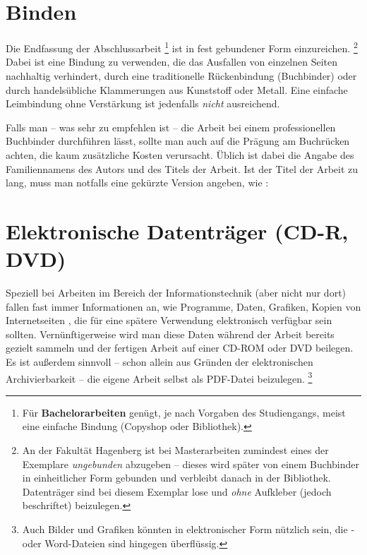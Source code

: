 \section{Binden}

Die Endfassung der Abschlussarbeit%
\footnote{Für \textbf{Bachelorarbeiten} genügt, je nach Vorgaben des Studiengangs, meist eine einfache Bindung (Copyshop oder Bibliothek).}
ist in fest gebundener Form
einzureichen.%
\footnote{An der Fakultät Hagenberg ist bei Masterarbeiten zumindest eines der
Exemplare \emph{ungebunden} abzugeben -- dieses wird später von einem
Buchbinder in einheitlicher Form gebunden und verbleibt
danach in der Bibliothek. Datenträger sind bei diesem Exemplar lose 
und \emph{ohne} Aufkleber (jedoch beschriftet) beizulegen.}
Dabei ist eine Bindung zu
verwenden, die das Ausfallen von einzelnen Seiten nachhaltig
verhindert, \zB durch eine traditionelle Rückenbindung
(Buchbinder) oder durch handelsübliche Klammerungen aus Kunststoff
oder Metall. Eine einfache Leimbindung ohne Verstärkung ist
jedenfalls \emph{nicht} ausreichend.


Falls man -- was sehr zu empfehlen ist -- die Arbeit bei einem
professionellen Buchbinder durchführen lässt, sollte man auch auf
die Prägung am Buchrücken achten, die kaum zusätzliche Kosten
verursacht. Üblich ist dabei die Angabe des Familiennamens des
Autors und des Titels der Arbeit. Ist der Titel der Arbeit zu
lang, muss man notfalls eine gekürzte  Version angeben, wie \zB:
%
\begin{center}
\setlength{\fboxsep}{3mm}
\end{center}
%



\section{Elektronische Datenträger (CD-R, DVD)}
Speziell bei Arbeiten im Bereich der Informationstechnik (aber
nicht nur dort) fallen fast immer Informationen an, wie Programme,
Daten, Grafiken, Kopien von Internetseiten \usw, die für eine
spätere Verwendung elektronisch verfügbar sein sollten.
Vernünftigerweise wird man diese Daten während der Arbeit bereits
gezielt sammeln und der fertigen Arbeit auf einer CD-ROM oder DVD
beilegen. Es ist außerdem sinnvoll -- schon allein aus Gründen der
elektronischen Archivierbarkeit -- die eigene Arbeit selbst als
PDF-Datei beizulegen.%
\footnote{Auch Bilder und Grafiken könnten in elektronischer Form nützlich
sein, die \latex- oder Word-Dateien sind hingegen überflüssig.}


